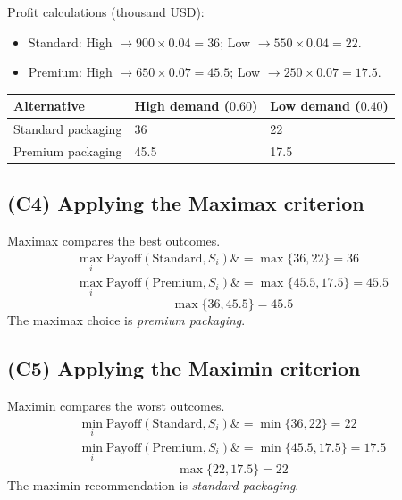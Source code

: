 \documentclass[11pt]{article}
\begin{document}
	\hypertarget{problem4-c3}{}
	
	Profit calculations (thousand USD):
	\begin{itemize}
		\item Standard: High $\to 900 \times 0.04 = 36$; Low $\to 550 \times 0.04 = 22$.
		\item Premium: High $\to 650 \times 0.07 = 45.5$; Low $\to 250 \times 0.07 = 17.5$.
	\end{itemize}
	\begin{center}
		\begin{tabular}{lll}
			\toprule
			Alternative & High demand
			($0.60$) & Low demand
			($0.40$) \\
			\midrule
			Standard packaging & 36 & 22 \\
			Premium packaging & 45.5 & 17.5 \\
			\bottomrule
		\end{tabular}
	\end{center}
	
	\subsection*{(C4) Applying the Maximax criterion}
	
	\hypertarget{problem4-c4}{}
	
	Maximax compares the best outcomes.
	\[
	\begin{aligned}
		\max_i \text{Payoff}(\text{Standard}, S_i) \&= \max\{36, 22\} = 36 \\
		\max_i \text{Payoff}(\text{Premium}, S_i) \&= \max\{45.5, 17.5\} = 45.5
	\end{aligned}
	\]
	\[
	\max\{36, 45.5\} = 45.5
	\]
	The maximax choice is \emph{premium packaging}.
	
	\subsection*{(C5) Applying the Maximin criterion}
	
	\hypertarget{problem4-c5}{}
	
	Maximin compares the worst outcomes.
	\[
	\begin{aligned}
		\min_i \text{Payoff}(\text{Standard}, S_i) \&= \min\{36, 22\} = 22 \\
		\min_i \text{Payoff}(\text{Premium}, S_i) \&= \min\{45.5, 17.5\} = 17.5
	\end{aligned}
	\]
	\[
	\max\{22, 17.5\} = 22
	\]
	The maximin recommendation is \emph{standard packaging}.
	
\end{document}
